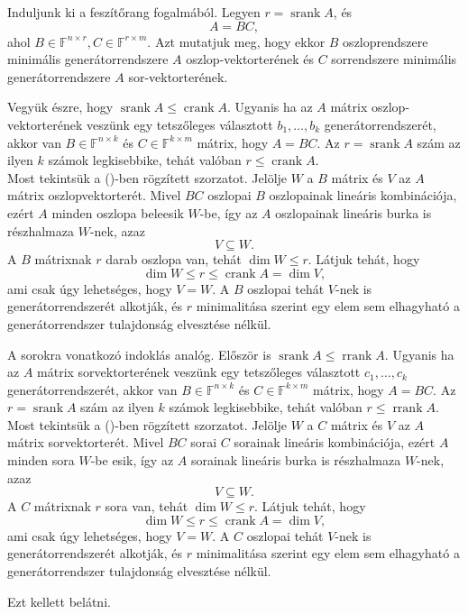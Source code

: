 \documentclass[9pt, showtrims]{memoir}
\makeatletter
\renewenvironment{proof}[1][\proofname]
    {\par\pushQED{\qed}%
    \normalfont \topsep6\p@\@plus6\p@\relax
    \trivlist
    \item[\hskip\labelsep
        \itshape
    #1\@addpunct{:}]\ignorespaces}
    {\popQED\endtrivlist\@endpefalse}
\theoremstyle{plain}
\theoremstyle{remark}
\theoremstyle{definition}
\renewcommand{\mathbf}{\mathbb}
\DeclareMathOperator{\crank}{crank}
\DeclareMathOperator{\rrank}{rrank}
\DeclareMathOperator{\srank}{srank}
\makeatother
\begin{document}
\begin{proof}
    Induljunk ki a feszítőrang fogalmából.
    Legyen $r=\srank{A}$, és 
    \[
        A=BC,\tag{\dag}
    \]
    ahol $B\in\mathbf{F}^{n\times r},C\in\mathbf{F}^{r\times m}$.
    Azt mutatjuk meg, hogy ekkor $B$ oszloprendszere minimális generátorrendszere $A$ oszlop-vektorterének
    és $C$ sorrendszere minimális generátorrendszere $A$ sor-vektorterének.

    Vegyük észre, hogy $\srank{A}\leq \crank{A}$.
    Ugyanis ha az $A$ mátrix oszlop-vektorterének veszünk egy tetszőleges választott
    $b_1,\dots,b_k$ generátorrendszerét, 
    akkor van $B\in\mathbf{F}^{n\times k}$ és $C\in\mathbf{F}^{k\times m}$ mátrix, hogy $A=BC$.
    Az $r=\srank{A}$ szám az ilyen $k$ számok legkisebbike, tehát valóban $r\leq\crank{A}$.
    \\
    Most tekintsük a (\dag)-ben rögzített szorzatot.
    Jelölje $W$ a $B$ mátrix és $V$ az $A$ mátrix oszlopvektorterét.
    Mivel $BC$ oszlopai $B$ oszlopainak lineáris kombinációja, 
    ezért $A$ minden oszlopa beleesik $W$-be, 
    így az $A$ oszlopainak lineáris burka is részhalmaza $W$-nek,
    azaz 
    \[
        V\subseteq W.
    \]
    A $B$ mátrixnak $r$ darab oszlopa van, 
    tehát $\dim W\leq r$.
    Látjuk tehát, hogy 
    \[\dim W\leq r\leq\crank{A}=\dim V,
    \]
    ami csak úgy lehetséges, 
    hogy $V=W$.
    A $B$ oszlopai tehát $V$-nek is generátorrendszerét alkotják,
    és $r$ minimalitása szerint egy elem sem elhagyható a generátorrendszer tulajdonság
    elvesztése nélkül.

    A sorokra vonatkozó indoklás analóg.
    Először is $\srank{A}\leq \rrank{A}$.
    Ugyanis ha az $A$ mátrix sorvektorterének veszünk egy tetszőleges választott
    $c_1,\dots,c_k$ generátorrendszerét, 
    akkor van $B\in\mathbf{F}^{n\times k}$ és $C\in\mathbf{F}^{k\times m}$ mátrix, hogy $A=BC$.
    Az $r=\srank{A}$ szám az ilyen $k$ számok legkisebbike, tehát valóban $r\leq\rrank{A}$.
    \\
    Most tekintsük a (\dag)-ben rögzített szorzatot.
    Jelölje $W$ a $C$ mátrix és $V$ az $A$ mátrix sorvektorterét.
    Mivel $BC$ sorai $C$ sorainak lineáris kombinációja, 
    ezért $A$ minden sora $W$-be esik,
    így az $A$ sorainak lineáris burka is részhalmaza $W$-nek,
    azaz 
    \[
        V\subseteq W.
    \]
    A $C$ mátrixnak $r$ sora van, 
    tehát $\dim W\leq r$.
    Látjuk tehát, hogy 
    \[\dim W\leq r\leq\crank{A}=\dim V,
    \]
    ami csak úgy lehetséges, 
    hogy $V=W$.
    A $C$ oszlopai tehát $V$-nek is generátorrendszerét alkotják,
    és $r$ minimalitása szerint egy elem sem elhagyható a generátorrendszer tulajdonság
    elvesztése nélkül.

    Ezt kellett belátni. 
\end{proof}
\end{document}
